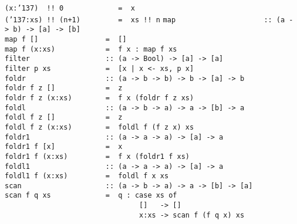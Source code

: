 \mbox{\tt (x:{\char'137})\ \ !!\ 0\ \ \ \ \ \ \ \ \ \ \ \ \ =\ \ x}\\
\mbox{\tt ({\char'137}:xs)\ !!\ (n+1)\ \ \ \ \ \ \ \ \ =\ \ xs\ !!\ n}
%
\eprogB\noindent\bprogB
\mbox{\tt map\ \ \ \ \ \ \ \ \ \ \ \ \ \ \ \ \ \ \ \ \ ::\ (a\ ->\ b)\ ->\ [a]\ ->\ [b]}\\
\mbox{\tt map\ f\ []\ \ \ \ \ \ \ \ \ \ \ \ \ \ \ \ =\ \ []}\\
\mbox{\tt map\ f\ (x:xs)\ \ \ \ \ \ \ \ \ \ \ \ =\ \ f\ x\ :\ map\ f\ xs}
%
\eprogB\noindent\bprogB
\mbox{\tt filter\ \ \ \ \ \ \ \ \ \ \ \ \ \ \ \ \ \ ::\ (a\ ->\ Bool)\ ->\ [a]\ ->\ [a]}\\
\mbox{\tt filter\ p\ xs\ \ \ \ \ \ \ \ \ \ \ \ \ =\ \ [x\ |\ x\ <-\ xs,\ p\ x]}
%
\eprogB\noindent\bprogB
\mbox{\tt foldr\ \ \ \ \ \ \ \ \ \ \ \ \ \ \ \ \ \ \ ::\ (a\ ->\ b\ ->\ b)\ ->\ b\ ->\ [a]\ ->\ b}\\
\mbox{\tt foldr\ f\ z\ []\ \ \ \ \ \ \ \ \ \ \ \ =\ \ z}\\
\mbox{\tt foldr\ f\ z\ (x:xs)\ \ \ \ \ \ \ \ =\ \ f\ x\ (foldr\ f\ z\ xs)}
%
\eprogB\noindent\bprogB
\mbox{\tt foldl\ \ \ \ \ \ \ \ \ \ \ \ \ \ \ \ \ \ \ ::\ (a\ ->\ b\ ->\ a)\ ->\ a\ ->\ [b]\ ->\ a}\\
\mbox{\tt foldl\ f\ z\ []\ \ \ \ \ \ \ \ \ \ \ \ =\ \ z}\\
\mbox{\tt foldl\ f\ z\ (x:xs)\ \ \ \ \ \ \ \ =\ \ foldl\ f\ (f\ z\ x)\ xs}
%
\eprogB\noindent\bprogB
\mbox{\tt foldr1\ \ \ \ \ \ \ \ \ \ \ \ \ \ \ \ \ \ ::\ (a\ ->\ a\ ->\ a)\ ->\ [a]\ ->\ a}\\
\mbox{\tt foldr1\ f\ [x]\ \ \ \ \ \ \ \ \ \ \ \ =\ \ x}\\
\mbox{\tt foldr1\ f\ (x:xs)\ \ \ \ \ \ \ \ \ =\ \ f\ x\ (foldr1\ f\ xs)}
%
\eprogB\noindent\bprogB
\mbox{\tt foldl1\ \ \ \ \ \ \ \ \ \ \ \ \ \ \ \ \ \ ::\ (a\ ->\ a\ ->\ a)\ ->\ [a]\ ->\ a}\\
\mbox{\tt foldl1\ f\ (x:xs)\ \ \ \ \ \ \ \ \ =\ \ foldl\ f\ x\ xs}
%
\eprogB\noindent\bprogB
\mbox{\tt scan\ \ \ \ \ \ \ \ \ \ \ \ \ \ \ \ \ \ \ \ ::\ (a\ ->\ b\ ->\ a)\ ->\ a\ ->\ [b]\ ->\ [a]}\\
\mbox{\tt scan\ f\ q\ xs\ \ \ \ \ \ \ \ \ \ \ \ \ =\ \ q\ :\ case\ xs\ of}\\
\mbox{\tt \ \ \ \ \ \ \ \ \ \ \ \ \ \ \ \ \ \ \ \ \ \ \ \ \ \ \ \ \ \ \ \ []\ \ \ ->\ []}\\
\mbox{\tt \ \ \ \ \ \ \ \ \ \ \ \ \ \ \ \ \ \ \ \ \ \ \ \ \ \ \ \ \ \ \ \ x:xs\ ->\ scan\ f\ (f\ q\ x)\ xs}
